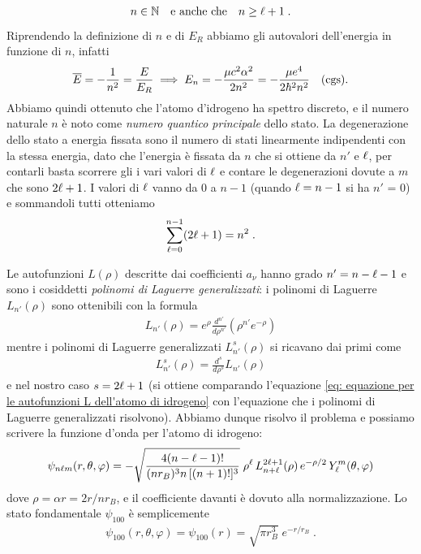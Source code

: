 \begin{align*}
  n \in \mathbb{N}  \quad \text{e anche che} \quad  n \geq \ell + 1 \;.
\end{align*}
Riprendendo la definizione di $ n $ e di $ E_R $ abbiamo gli autovalori dell'energia in funzione di $ n $, infatti 
\begin{align*}
  \overline{E} = -\frac1{n^2} = \frac{E}{E_R} \implies E_n = - \frac{\mu c^2 \alpha^2}{2n^2} = -\frac{\mu e^4}{2 \hbar^2 n^2} \quad \text{(cgs)}.
\end{align*}
Abbiamo quindi ottenuto che l'atomo d'idrogeno ha spettro discreto, e il numero naturale $ n $ è noto come \textit{numero quantico principale} dello 
stato. La degenerazione dello stato a energia fissata sono il numero di stati linearmente indipendenti con la stessa energia, dato che l'energia è 
fissata da $ n $ che si ottiene da $ n' $ e $ \ell $, per contarli basta scorrere gli i vari valori di $ \ell $ e contare le degenerazioni dovute a $ m $
che sono $ 2\ell +1 $. I valori di $ \ell  $ vanno da $ 0 $ a $ n - 1 $ (quando $ \ell = n - 1 $ si ha $ n' $ = 0) e sommandoli tutti otteniamo 
\begin{align*}
  \sum_{\ell = 0}^{n - 1} (2\ell + 1) = n^2 \;.
\end{align*}

Le autofunzioni $ L(\rho) $ descritte dai coefficienti $ a_\nu $ hanno grado $ n' = n - \ell - 1 $ e sono i cosiddetti 
\textit{polinomi di Laguerre generalizzati}: i polinomi di Laguerre $ L_{n'}(\rho) $ sono ottenibili con la formula 
\begin{align*}
  L_{n'}(\rho) = e^\rho \frac{d^{n'}}{d\rho^{n'}} \left( \rho^{n'} e^{-\rho} \right)
\end{align*}
mentre i polinomi di Laguerre generalizzati $ L_{n'}^s(\rho) $ si ricavano dai primi come 
\begin{align*}
  L_{n'}^s(\rho) = \frac{d^s}{d\rho^s} L_{n'}(\rho)
\end{align*}
e nel nostro caso $ s = 2\ell + 1 $ (si ottiene comparando l'equazione \ref{eq: equazione per le autofunzioni L dell'atomo di idrogeno} con 
l'equazione che i polinomi di Laguerre generalizzati risolvono). Abbiamo dunque risolvo il problema e possiamo scrivere la funzione d'onda per 
l'atomo di idrogeno:
\begin{align*}
  \psi_{n\l m}(r, \theta, \varphi) = - \sqrt{ \frac{4 (n - \l -1)!}{(n r_B)^3 n \, [(n+1)!]^3}}
  \; \rho^\l\, L_{n+\l}^{2\l + 1}(\rho)\, e^{- \rho/2}\, Y_\l^m(\theta,\varphi)
\end{align*}
dove $ \rho = \alpha r = 2r / n r_B $, e il coefficiente davanti è dovuto alla normalizzazione. 
Lo stato fondamentale $ \psi_{100} $ è semplicemente 
\begin{align*}
  \psi_{100}(r, \theta, \varphi) = \psi_{100}(r) = \sqrt{\pi r_B^3} \; e^{-r/r_B}\;.
\end{align*}


